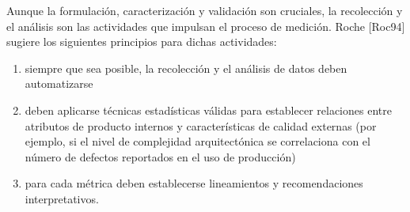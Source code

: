Aunque la formulación, caracterización y validación son cruciales, la recolección y el análisis son las actividades que impulsan el proceso de medición. Roche [Roc94] sugiere los siguientes principios para dichas actividades:\\
\begin{enumerate}
    \item siempre que sea posible, la recolección y el análisis de
datos deben automatizarse
    \item deben aplicarse técnicas estadísticas válidas para establecer relaciones entre atributos de producto internos y características de calidad externas (por ejemplo, si el nivel de complejidad arquitectónica se correlaciona con el número de defectos reportados en el uso de producción)
    \item para cada métrica deben establecerse lineamientos y recomendaciones interpretativos.
\end{enumerate}
